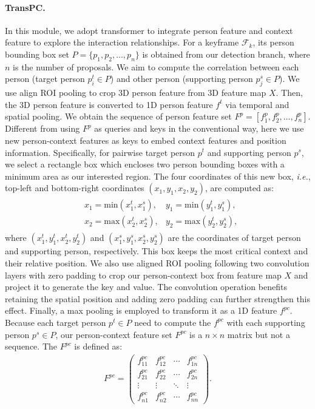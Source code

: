 \documentclass[final]{cvpr}
\newcommand{\iie}{\emph{i.e.}}
\begin{document}
\paragraph{TransPC.}
In this module, we adopt transformer to integrate person feature and context feature to explore the interaction relationships. For a keyframe $\mathcal{F}_k$, its person bounding box set $P =\{p_1,p_2,...,p_n\}$ is obtained from our detection branch, where $n$ is the number of proposals. We aim to compute the correlation between each person  (target person $p^t_i\in P$) and other person (supporting person $p^s_j \in P$). We use align ROI pooling to crop 3D person feature from 3D feature map $X$. Then, the 3D person feature is converted to 1D person feature $f^t$ via temporal and spatial pooling. We obtain the sequence of person feature set $F^p=[f^p_1,f^p_2,...,f^p_n]$. Different from using $F^p$ as queries and keys in the conventional way, here we use new person-context features as keys to embed context features and position information. Specifically, for pairwise target person $p^t$ and supporting person $p^s$, we select a rectangle box which encloses two person bounding boxes with a minimum area as our interested region. The four coordinates of this new box, \iie, top-left and bottom-right coordinates $(x_1, y_1, x_2, y_2)$, are computed as:
\begin{eqnarray}
\begin{split}
    &x_1 = \textrm{min}(x^t_1, x^s_1),
    &y_1 = \textrm{min}(y^t_1, y^s_1),\\
    &x_2 = \textrm{max}(x^t_2, x^s_2),
    &y_2 = \textrm{max}(y^t_2, y^s_2),
\end{split}
\end{eqnarray}
where $(x^t_1, y^t_1, x^t_2, y^t_2)$ and $(x^s_1, y^s_1, x^s_2, y^s_2)$ are the coordinates of target person and supporting person, respectively.
This box keeps the most critical context and their relative position. We also use aligned ROI pooling following two convolution layers with zero padding to crop our person-context box from feature map $X$ and project it to generate the key and value. The convolution operation benefits retaining the spatial position and adding zero padding can further strengthen this effect. Finally, a max pooling is employed to transform it as a 1D feature $f^{pc}$. Because each target person $p^t\in P$ need to compute the $f^{pc}$ with each supporting person $p^s\in P$, our person-context feature set $F^{pc}$ is a $n \times n$ matrix but not a sequence. The $F^{pc}$ is defined as:
\begin{equation}
\begin{matrix}
F^{pc}=
\begin{pmatrix}
f_{11}^{pc} & f_{12}^{pc} & \cdots & f_{1n}^{pc} \\
f_{21}^{pc} & f_{22}^{pc} & \cdots & f_{2n}^{pc} \\
\vdots & \vdots & \ddots & \vdots \\
f_{n1}^{pc} & f_{n2}^{pc} & \cdots & f_{nn}^{pc} 
\end{pmatrix}.
\end{matrix}
\label{F_pc}
\end{equation}
\end{document}
